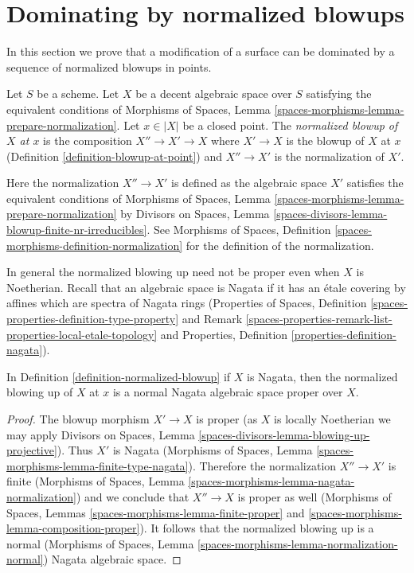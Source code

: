 \section{Dominating by normalized blowups}
\label{section-normalized-blowups}

\noindent
In this section we prove that a modification of a surface can be dominated
by a sequence of normalized blowups in points.

\begin{definition}
\label{definition-normalized-blowup}
Let $S$ be a scheme. Let $X$ be a decent algebraic space over $S$ satisfying
the equivalent conditions of
Morphisms of Spaces, Lemma \ref{spaces-morphisms-lemma-prepare-normalization}.
Let $x \in |X|$ be a closed point. The {\it normalized blowup of $X$ at $x$}
is the composition $X'' \to X' \to X$ where $X' \to X$ is the blowup
of $X$ at $x$ (Definition \ref{definition-blowup-at-point})
and $X'' \to X'$ is the normalization of $X'$.
\end{definition}

\noindent
Here the normalization $X'' \to X'$ is defined as the algebraic space
$X'$ satisfies the equivalent conditions of
Morphisms of Spaces, Lemma \ref{spaces-morphisms-lemma-prepare-normalization}
by
Divisors on Spaces, Lemma
\ref{spaces-divisors-lemma-blowup-finite-nr-irreducibles}.
See Morphisms of Spaces, Definition
\ref{spaces-morphisms-definition-normalization}
for the definition of the normalization.

\medskip\noindent
In general the normalized blowing up need not be proper even
when $X$ is Noetherian. Recall that an algebraic space is Nagata if it
has an \'etale covering by affines which are spectra of Nagata rings
(Properties of Spaces, Definition
\ref{spaces-properties-definition-type-property} and
Remark \ref{spaces-properties-remark-list-properties-local-etale-topology} and
Properties, Definition \ref{properties-definition-nagata}).

\begin{lemma}
\label{lemma-Nagata-normalized-blowup}
In Definition \ref{definition-normalized-blowup} if $X$ is Nagata,
then the normalized blowing up of $X$ at $x$ is a
normal Nagata algebraic space proper over $X$.
\end{lemma}

\begin{proof}
The blowup morphism $X' \to X$ is proper
(as $X$ is locally Noetherian we may apply
Divisors on Spaces, Lemma \ref{spaces-divisors-lemma-blowing-up-projective}).
Thus $X'$ is Nagata
(Morphisms of Spaces, Lemma \ref{spaces-morphisms-lemma-finite-type-nagata}).
Therefore the normalization $X'' \to X'$ is finite
(Morphisms of Spaces, Lemma \ref{spaces-morphisms-lemma-nagata-normalization})
and we conclude that $X'' \to X$ is proper as well
(Morphisms of Spaces, Lemmas \ref{spaces-morphisms-lemma-finite-proper} and
\ref{spaces-morphisms-lemma-composition-proper}).
It follows that the normalized blowing up
is a normal (Morphisms of Spaces, Lemma
\ref{spaces-morphisms-lemma-normalization-normal})
Nagata algebraic space.
\end{proof}


